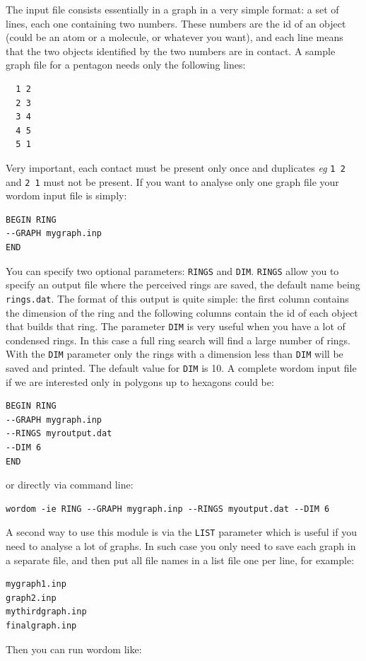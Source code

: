 \documentclass[11pt,twoside,onecolumn,a4paper,openright,notitlepage]{book}[2001/04/21]
\begin{document}
The input file consists essentially in a graph in a very simple format: a set of lines, each one containing two numbers. These numbers are the id of an object (could be an atom or a molecule, or whatever you want), and each line means that the two objects identified by the two numbers are in contact. A sample graph file for a pentagon needs only the following lines:

\begin{verbatim}
  1 2
  2 3
  3 4
  4 5
  5 1
\end{verbatim}
Very important, each contact must be present only once and duplicates {\em eg} \verb=1 2= and \verb=2 1= must not be present. If you want to analyse only one graph file your wordom input file is simply:

\begin{verbatim}
BEGIN RING
--GRAPH mygraph.inp
END
\end{verbatim}

You can specify two optional parameters: \verb=RINGS= and \verb=DIM=. \verb=RINGS= allow you to specify an output file where the perceived rings are saved, the default name being \verb=rings.dat=. The format of this output is quite simple: the first column contains the dimension of the ring and the following columns contain the id of each object that builds that ring. The parameter \verb=DIM= is very useful when you have a lot of condensed rings. In this case a full ring search will find a large number of rings. With the \verb=DIM= parameter only the rings with a dimension less than \verb=DIM= will be saved and printed. The default value for \verb=DIM= is 10. A complete wordom input file if we are interested only in polygons up to hexagons could be:

\begin{verbatim}
BEGIN RING
--GRAPH mygraph.inp
--RINGS myroutput.dat
--DIM 6
END
\end{verbatim}
%
or directly via command line:

\begin{verbatim}
wordom -ie RING --GRAPH mygraph.inp --RINGS myoutput.dat --DIM 6
\end{verbatim}

A second way to use this module is via the \verb=LIST= parameter which is useful if you need to analyse a lot of graphs. In such case you only need to save each graph in a separate file, and then put all file names in a list file one per line, for example:

\begin{verbatim}
mygraph1.inp
graph2.inp
mythirdgraph.inp
finalgraph.inp
\end{verbatim}
%
Then you can run wordom like:
\end{document}
